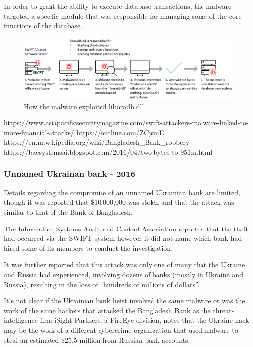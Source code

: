 \documentclass[12pt]{article}
\begin{document}
        In order to grant the ability to execute database transactions, the malware targeted a specific module that was responsible for managing some of the core functions of the database.
        
        \begin{figure}[H]
        \centering
        \includegraphics[width=\textwidth]{figures/liboradb.png}
        \caption{How the malware exploited liboradb.dll}
        \label{fig:liboradb}
        \end{figure}
        
        
        https://www.asiapacificsecuritymagazine.com/swift-attackers-malware-linked-to-more-financial-attacks/
        https://outline.com/ZCjsmE
        https://en.m.wikipedia.org/wiki/Bangladesh_Bank_robbery
        https://baesystemsai.blogspot.com/2016/04/two-bytes-to-951m.html
        
    \subsubsection{Unnamed Ukrainan bank - 2016}
        Details regarding the compromise of an unnamed Ukrainian bank are limited, though it was reported that \$10,000,000 was stolen and that the attack was similar to that of the Bank of Bangladesh. 
        
        The Information Systems Audit and Control Association reported that the theft had occurred via the SWIFT system however it did not name which bank had hired some of its members to conduct the investigation.\cite{BangladeshBankEnds}
        
        It was further reported that this attack was only one of many that the Ukraine and Russia had experienced, involving dozens of banks (mostly in Ukraine and Russia), resulting in the loss of “hundreds of millions of dollars”. 
        
        It's not clear if the Ukrainian bank heist involved the same malware or was the work of the same hackers that attacked the Bangladesh Bank as the threat-intelligence firm iSight Partners, a FireEye division, notes that the Ukraine hack may be the work of a different cybercrime organization that used malware to steal an estimated \$25.5 million from Russian bank accounts.\cite{HackersReportedlySteal2016}
   
\end{document}
